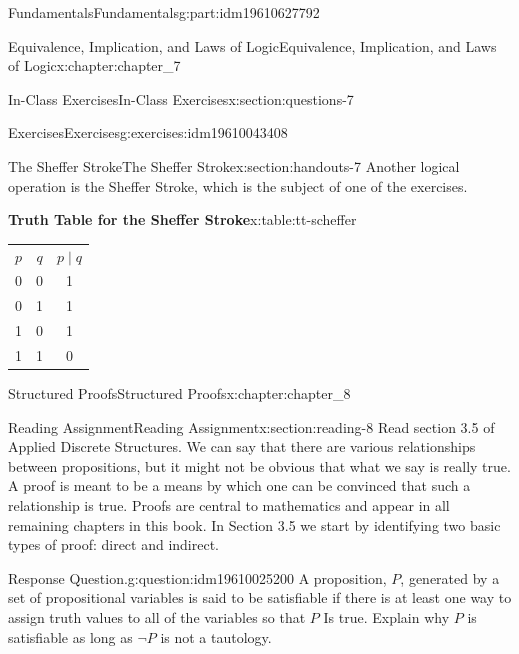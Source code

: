 \documentclass[oneside,10pt,]{book}
\newcommand{\tabularfont}{\relax}
\numberwithin{equation}{section}
\begin{document}
\begin{partptx}{Fundamentals}{}{Fundamentals}{}{}{g:part:idm19610627792}
\begin{chapterptx}{Equivalence, Implication, and Laws of Logic}{}{Equivalence, Implication, and Laws of Logic}{}{}{x:chapter:chapter_7}
\begin{sectionptx}{In-Class Exercises}{}{In-Class Exercises}{}{}{x:section:questions-7}
\begin{exercises-subsection-numberless}{Exercises}{}{Exercises}{}{}{g:exercises:idm19610043408}
\par\medskip\noindent
\end{exercises-subsection-numberless}
\end{sectionptx}
%
%
\typeout{************************************************}
\typeout{************************************************}
%
\begin{sectionptx}{The Sheffer Stroke}{}{The Sheffer Stroke}{}{}{x:section:handouts-7}
%
Another logical operation is the Sheffer Stroke, which is the subject of one of the exercises.%
\begin{tableptx}{\textbf{Truth Table for the Sheffer Stroke}}{x:table:tt-scheffer}{}%
\centering%
{\tabularfont%
\begin{tabular}{ccc}
\(p\)&\(q\)&\(p \mid q\)\tabularnewline[0pt]
0&0&1\tabularnewline[0pt]
0&1&1\tabularnewline[0pt]
1&0&1\tabularnewline[0pt]
1&1&0
\end{tabular}
}%
\end{tableptx}%
\end{sectionptx}
\end{chapterptx}
%
\typeout{************************************************}
\typeout{************************************************}
%
\begin{chapterptx}{Structured Proofs}{}{Structured Proofs}{}{}{x:chapter:chapter_8}
%
%
%
\typeout{************************************************}
\typeout{************************************************}
%
\begin{sectionptx}{Reading Assignment}{}{Reading Assignment}{}{}{x:section:reading-8}
Read section 3.5 of Applied Discrete Structures.  We can say that there are various relationships between propositions, but it might not be obvious that what we say is really true.  A proof is meant to be a means by which one can be convinced that such a relationship is true. Proofs are central to mathematics and appear in all remaining chapters in this book.  In Section 3.5 we start by identifying two basic types of proof: direct and indirect.%
\begin{question}{Response Question.}{g:question:idm19610025200}%
A proposition, \(P\), generated by a set of propositional variables is said to be satisfiable if there is at least one way to assign truth values to all of the variables so that \(P\) Is true. Explain why \(P\) is satisfiable as long as \(\neg P\)  is not a tautology.%
\end{question}

\end{sectionptx}
\end{chapterptx}
\end{partptx}
\end{document}
